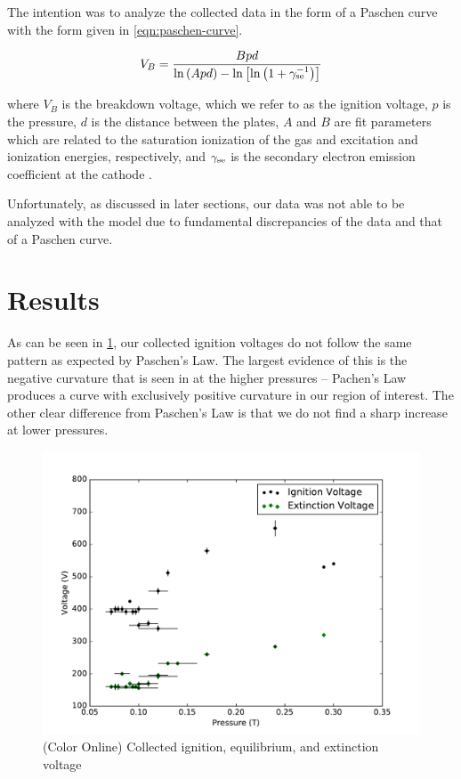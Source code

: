 \documentclass[reprint]{revtex4-1}
\begin{document}
The intention was to analyze the collected data in the form of a Paschen curve with the form given in \cref{eqn:paschen-curve}.

\begin{equation}
V_B = \frac{B p d}{\ln{\left( A p d \right)} - \ln{\left[ \ln{\left( 1 + \gamma_{\rm{se}}^{-1} \right)} \right]}}
\label{eqn:paschen-curve}
\end{equation}

where $V_B$ is the breakdown voltage, which we refer to as the ignition voltage, $p$ is the pressure, $d$ is the distance between the plates, $A$ and $B$ are fit parameters which are related to the saturation ionization of the gas and excitation and ionization energies, respectively, and $\gamma_{\rm{se}}$ is the secondary electron emission coefficient at the cathode \cite{Lieberman2005}.

Unfortunately, as discussed in later sections, our data was not able to be analyzed with the model due to fundamental discrepancies of the data and that of a Paschen curve.

\section{Results}

As can be seen in \cref{fig:ignition-extinction}, our collected ignition voltages do not follow the same pattern as expected by Paschen's Law. The largest evidence of this is the negative curvature that is seen in at the higher pressures -- Pachen's Law produces a curve with exclusively positive curvature in our region of interest. The other clear difference from Paschen's Law is that we do not find a sharp increase at lower pressures.

\begin{figure}
\includegraphics[width=\columnwidth]{../resources/ignition-extinction.pdf}
\caption{(Color Online) Collected ignition, equilibrium, and extinction voltage}
\label{fig:ignition-extinction}
\end{figure}
\end{document}
